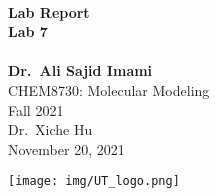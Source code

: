 \thispagestyle{empty}
\begin{titlepage}


\vfill
\begin{center}

    \HRule \\[0.4cm]
    \textbf{\Huge{Lab Report}}\\
    \textbf{\Large{Lab 7}}\\
    \HRule \\[0.4cm]
    \bigskip
    \bigskip
    \Large
    \textbf{Dr.~Ali Sajid Imami}\\
    \bigskip
    CHEM8730: Molecular Modeling\\
    
    Fall 2021\\
    
    Dr.~Xiche Hu\\
    
    November 20, 2021\\
    \vfill
    
    \texttt{[image: img/UT\_logo.png]}
\end{center}
\vfill
\end{titlepage}
